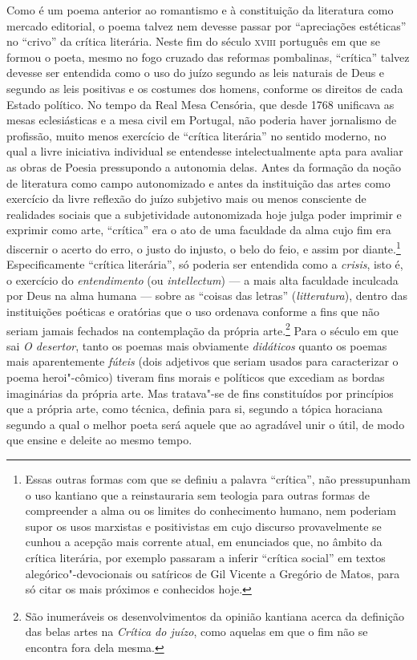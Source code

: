 Como é um poema anterior ao romantismo e à constituição da literatura como
mercado editorial, o poema talvez nem devesse passar por ``apreciações
estéticas'' no ``crivo'' da crítica literária.  Neste fim do século
\textsc{xviii} português em que se formou o poeta, mesmo no fogo cruzado das
reformas pombalinas, ``crítica'' talvez devesse ser entendida como o uso do
juízo segundo as leis naturais de Deus e segundo as leis positivas e os costumes
dos homens, conforme os direitos de cada Estado político.  No tempo da Real Mesa
Censória, que desde 1768 unificava as mesas eclesiásticas e a mesa civil em
Portugal, não poderia haver jornalismo de profissão, muito menos exercício de
``crítica literária'' no sentido moderno, no qual a livre iniciativa individual
se entendesse intelectualmente apta para avaliar as obras de Poesia pressupondo
a autonomia delas.  Antes da formação da noção de literatura como campo
autonomizado e antes da instituição das artes como exercício da livre reflexão
do juízo subjetivo mais ou menos consciente de realidades sociais que a
subjetividade autonomizada hoje julga poder imprimir e exprimir como arte,
``crítica'' era o ato de uma faculdade da alma cujo fim era discernir o acerto
do erro, o justo do injusto, o belo do feio, e assim por diante.\footnote{ 
Essas outras formas com que se definiu a palavra ``crítica'', não pressupunham o
uso kantiano que a reinstauraria sem teologia para outras formas de compreender
a alma ou os limites do conhecimento humano, nem poderiam supor os usos
marxistas e positivistas em cujo discurso provavelmente se cunhou a acepção mais
corrente atual, em enunciados que, no âmbito da crítica literária, por exemplo
passaram a inferir ``crítica social'' em textos alegórico"-devocionais ou
satíricos de Gil Vicente a Gregório de Matos, para só citar os mais próximos e
conhecidos hoje.} Especificamente ``crítica literária'', só poderia ser
entendida como a \textit{crisis}, isto é, o exercício do \textit{entendimento}
(ou \textit{intellectum}) --- a mais alta faculdade inculcada por Deus na alma
humana --- sobre as ``coisas das letras'' (\textit{litteratura}), dentro das
instituições poéticas e oratórias que o uso ordenava conforme a fins que não
seriam jamais fechados na contemplação da própria arte.\footnote{ São
inumeráveis os desenvolvimentos da opinião kantiana acerca da definição das
belas artes na \textit{Crítica do juízo}, como aquelas em que o fim não se
encontra fora dela mesma.} Para o século em que sai \textit{O desertor}, tanto
os poemas mais obviamente \textit{didáticos} quanto os poemas mais aparentemente
\textit{fúteis} (dois adjetivos que seriam usados para caracterizar o poema
heroi"-cômico) tiveram fins morais e políticos que excediam as bordas imaginárias
da própria arte. Mas tratava"-se de fins constituídos por princípios que a
própria arte, como técnica, definia para si, segundo a tópica horaciana segundo
a qual o melhor poeta será aquele que ao agradável unir o útil, de modo que
ensine e deleite ao mesmo tempo.

